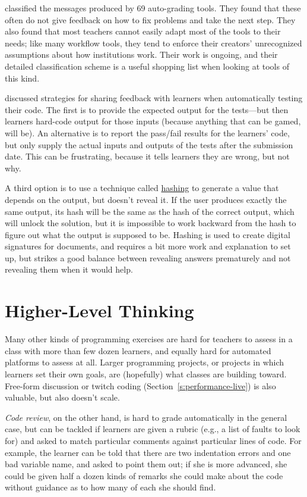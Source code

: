 \cite{Keun2016a,Keun2016b} classified the messages produced by 69
auto-grading tools. They found that these often do not give feedback on
how to fix problems and take the next step. They also found that most
teachers cannot easily adapt most of the tools to their needs; like many
workflow tools, they tend to enforce their creators' unrecognized
assumptions about how institutions work. Their work is ongoing, and
their detailed classification scheme is a useful shopping list when
looking at tools of this kind.

\cite{Srid2016} discussed strategies for sharing feedback with
learners when automatically testing their code. The first is to provide
the expected output for the tests---but then learners hard-code output for
those inputs (because anything that can be gamed, will be). An
alternative is to report the pass/fail results for the learners' code,
but only supply the actual inputs and outputs of the tests after the
submission date. This can be frustrating, because it tells learners they
are wrong, but not why.

A third option is to use a technique called \protect\hyperlink{g:hashing}{hashing} to
generate a value that depends on the output, but doesn't reveal it. If
the user produces exactly the same output, its hash will be the same
as the hash of the correct output, which will unlock the solution, but
it is impossible to work backward from the hash to figure out what the
output is supposed to be. Hashing is used to create digital signatures
for documents, and requires a bit more work and explanation to set up,
but strikes a good balance between revealing answers prematurely and
not revealing them when it would help.

\section{Higher-Level Thinking}\label{s:exercises-higher}

Many other kinds of programming exercises are hard for teachers to
assess in a class with more than few dozen learners, and equally hard
for automated platforms to assess at all. Larger programming projects,
or projects in which learners set their own goals, are (hopefully) what
classes are building toward. Free-form discussion or twitch coding
(Section~\ref{s:performance-live}) is also valuable, but also doesn't
scale.

\emph{Code review}, on the other hand, is hard to grade automatically in the
general case, but can be tackled if learners are given a rubric (e.g., a
list of faults to look for) and asked to match particular comments
against particular lines of code. For example, the learner can be told
that there are two indentation errors and one bad variable name, and
asked to point them out; if she is more advanced, she could be given
half a dozen kinds of remarks she could make about the code without
guidance as to how many of each she should find.

